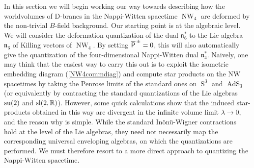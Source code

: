 \documentclass[11pt,a4paper]{article}
\DeclareMathOperator{\AdS}{AdS}
\DeclareMathOperator{\Sphere}{S}
\DeclareMathOperator{\NW}{NW}
\let\S\Sphere
\def\P{{\sf P}}
\def\mfn{{\mathfrak n}}
\newcommand{\real}{{\mathbb R}} %
\begin{document}
In this section we will begin working our way towards describing how
the worldvolumes of D-branes in the Nappi-Witten spacetime $\NW_4$ are
deformed by the non-trivial $B$-field background. Our starting point
is at the algebraic level. We will consider the deformation
quantization of the dual $\mathfrak{n}_6^*$ to the Lie
algebra $\mathfrak{n}^{~}_6$ of Killing vectors of $\NW_4$. By setting
$\overline{\P}^{\,\pm}=0$, this will also automatically give the
quantization of the four-dimensional Nappi-Witten dual $\mfn_4^*$. Naively,
one may think that the easiest way to carry this out is to exploit
the isometric embedding diagram (\ref{NW4commdiag}) and compute star
products on the NW spacetimes by taking the Penrose limits of the
standard ones on $\S^3$ and $\AdS_3$ (or equivalently by contracting
the standard quantizations of the Lie algebras ${\rm su}(2)$ and ${\rm
  sl}(2,\real)$). However, some quick calculations show that the
induced star-products obtained in this way are divergent in the
infinite volume limit $\lambda\to0$, and the reason why is
simple. While the standard In\"on\"u-Wigner contractions hold at the
level of the Lie algebras, they need not necessarily map the
corresponding universal enveloping algebras, on
which the quantizations are performed. We must therefore resort to a
more direct approach to quantizing the Nappi-Witten spacetime.
\end{document}
